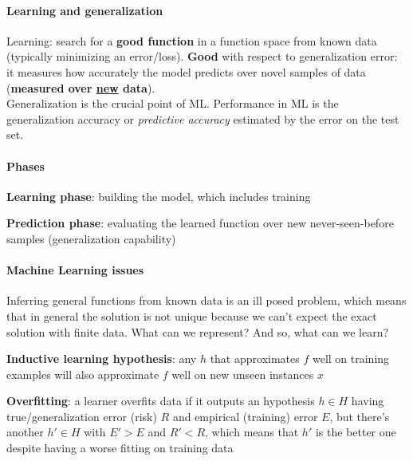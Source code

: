 \documentclass[10pt]{report}
\begin{document}
\paragraph{Learning and generalization} Learning: search for a \textbf{good function} in a function space from known data (typically minimizing an error/loss). \textbf{Good} with respect to generalization error: it measures how accurately the model predicts over novel samples of data (\textbf{measured over \underline{new} data}).\\
Generalization is the crucial point of ML. Performance in ML is the generalization accuracy or \textit{predictive accuracy} estimated by the error on the test set.
\paragraph{Phases}\begin{list}{}{}
	\item \textbf{Learning phase}: building the model, which includes training
	\item \textbf{Prediction phase}: evaluating the learned function over new never-seen-before samples (generalization capability)
\end{list}
\paragraph{Machine Learning issues} Inferring general functions from known data is an ill posed problem, which means that in general the solution is not unique because we can't expect the exact solution with finite data. What can we represent? And so, what can we learn?\begin{list}{}{}
	\item \textbf{Inductive learning hypothesis}: any $h$ that approximates $f$ well on training examples will also approximate $f$ well on new unseen instances $x$
	\item \textbf{Overfitting}: a learner overfits data if it outputs an hypothesis $h\in H$ having true/generalization error (risk) $R$ and empirical (training) error $E$, but there's another $h'\in H$ with $E' > E$ and $R' < R$, which means that $h'$ is the better one despite having a worse fitting on training data
\end{list}
\end{document}
